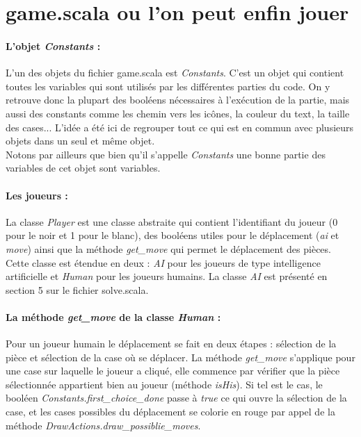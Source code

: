 \documentclass[a4paper]{article}
\begin{document}
\section{game.scala ou l'on peut enfin jouer}

\paragraph{L'objet \textit{Constants} :}L'un des objets du fichier game.scala est \textit{Constants}. C'est un objet qui contient toutes les variables qui sont utilisés par les différentes parties du code. On y retrouve donc la plupart des booléens nécessaires à l'exécution de la partie, mais aussi des constants comme les chemin vers les icônes, la couleur du text, la taille des cases... L'idée a été ici de regrouper tout ce qui est en commun avec plusieurs objets dans un seul et même objet. \\

Notons par ailleurs que bien qu'il s'appelle \textit{Constants} une bonne partie des variables de cet objet sont variables. 

\paragraph{Les joueurs :} La classe \textit{Player} est une classe abstraite qui contient l'identifiant du joueur (0 pour le noir et 1 pour le blanc), des booléens utiles pour le déplacement (\textit{ai} et \textit{move}) ainsi que la méthode \textit{get\_move} qui permet le déplacement des pièces. \\

Cette classe est étendue en deux : \textit{AI} pour les joueurs de type intelligence artificielle et \textit{Human} pour les joueurs humains. La classe \textit{AI} est présenté en section 5 sur le fichier solve.scala. 

\paragraph{La méthode \textit{get\_move} de la classe \textit{Human} :}Pour un joueur humain le déplacement se fait en deux étapes : sélection de la pièce et sélection de la case où se déplacer. La méthode \textit{get\_move} s'applique pour une case sur laquelle le joueur a cliqué, elle commence par vérifier que la pièce sélectionnée appartient bien au joueur (méthode \textit{isHis}). Si tel est le cas, le booléen \textit{Constants.first\_choice\_done} passe à \textit{true} ce qui ouvre la sélection de la case, et les cases possibles du déplacement se colorie en rouge par appel de la méthode \textit{DrawActions.draw\_possiblie\_moves}. \\
\end{document}
